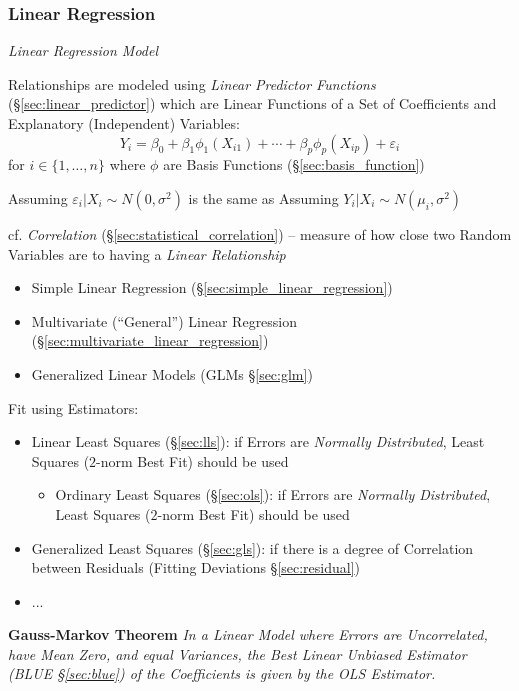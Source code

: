 \subsubsection{Linear Regression}\label{sec:linear_regression}

\emph{Linear Regression Model}

Relationships are modeled using \emph{Linear Predictor Functions}
(\S\ref{sec:linear_predictor}) which are Linear Functions of a Set of
Coefficients and Explanatory (Independent) Variables:
\[
  Y_i = \beta_0 + \beta_1\phi_1(X_{i1}) + \cdots +
    \beta_p\phi_p(X_{ip}) + \varepsilon_i
\]
for $i \in \{1, \ldots, n\}$ where $\phi$ are Basis Functions
(\S\ref{sec:basis_function})

Assuming $\varepsilon_i | X_i \sim N(0, \sigma^2)$ is the same as Assuming
$Y_i | X_i \sim N(\mu_i, \sigma^2)$

cf. \emph{Correlation} (\S\ref{sec:statistical_correlation}) -- measure of how
close two Random Variables are to having a \emph{Linear Relationship}

\begin{itemize}
  \item Simple Linear Regression (\S\ref{sec:simple_linear_regression})
  \item Multivariate (``General'') Linear Regression
    (\S\ref{sec:multivariate_linear_regression})
  \item Generalized Linear Models (GLMs \S\ref{sec:glm})
\end{itemize}

Fit using Estimators:
\begin{itemize}
  \item Linear Least Squares (\S\ref{sec:lls}): if Errors are
    \emph{Normally Distributed}, Least Squares ($2$-norm Best Fit) should be
    used
    \begin{itemize}
      \item Ordinary Least Squares (\S\ref{sec:ols}): if Errors are
        \emph{Normally Distributed}, Least Squares ($2$-norm Best Fit) should be
        used
    \end{itemize}
  \item Generalized Least Squares (\S\ref{sec:gls}): if
    there is a degree of Correlation between Residuals (Fitting Deviations
    \S\ref{sec:residual})
  \item ...
\end{itemize}

\textbf{Gauss-Markov Theorem} \emph{
  In a Linear Model where Errors are Uncorrelated, have Mean Zero, and equal
  Variances, the Best Linear Unbiased Estimator (BLUE \S\ref{sec:blue}) of the
  Coefficients is given by the OLS Estimator.
}

